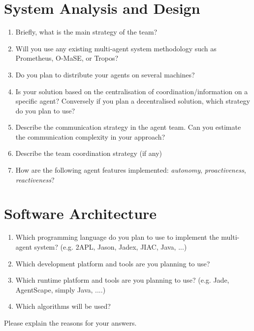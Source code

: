 \documentclass{llncs}
\begin{document}
\section*{System Analysis and Design}

\begin{enumerate}
  \item Briefly, what is the main strategy of the team?
  \item Will you use any existing multi-agent system
  methodology such as Prometheus, O-MaSE, or Tropos?
 \item Do you plan to distribute your agents on several machines?
 \item Is your solution based on the centralisation of
   coordination/information on a specific agent? Conversely if you
   plan a decentralised solution, which strategy do you plan to use?
\item Describe the communication strategy in the agent team. Can you
   estimate the communication complexity in your approach?
 \item Describe the team coordination strategy (if any)
 \item How are the following agent features implemented:
   \emph{autonomy}, \emph{proactiveness}, \emph{reactiveness}?
\end{enumerate}


\section*{Software Architecture}

\begin{enumerate}
\item Which programming language do you plan to use to implement the
  multi-agent system? (e.g. 2APL, Jason, Jadex, JIAC, Java, ...)
\item Which development platform and tools are you planning to use?
\item Which runtime platform and tools are you planning to use?
  (e.g. Jade, AgentScape, simply Java, ....)
\item Which algorithms will be used?
\end{enumerate}
Please explain the reasons for your answers.
\end{document}

